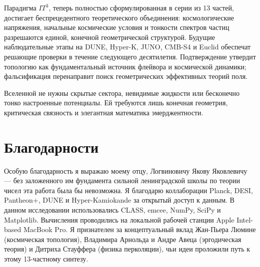 \documentclass[12pt,a4paper]{article}
\begin{document}
Парадигма $IT^3$, теперь полностью сформулированная в серии из 13 частей, достигает беспрецедентного теоретического объединения: космологические напряжения, начальные космические условия и тонкости спектров частиц разрешаются единой, конечной геометрической структурой. Будущие наблюдательные этапы на DUNE, Hyper-K, JUNO, CMB-S4 и Euclid обеспечат решающие проверки в течение следующего десятилетия. Подтверждение утвердит топологию как фундаментальный источник флейвора и космической динамики; фальсификация перенаправит поиск геометрических эффективных теорий поля. 

Вселенной не нужны скрытые сектора, невидимые жидкости или бесконечно тонко настроенные потенциалы. Ей требуются лишь конечная геометрия, критическая связность и элегантная математика эмерджентности.

\section*{Благодарности}
Особую благодарность я выражаю моему отцу, Логвиновичу Якову Яковлевичу — без заложенного им фундамента сильной ленинградской школы по теории чисел эта работа была бы невозможна. Я благодарю коллаборации Planck, DESI, Pantheon+, DUNE и Hyper-Kamiokande за открытый доступ к данным. В данном исследовании использовались CLASS, emcee, NumPy, SciPy и Matplotlib. Вычисления проводились на локальной рабочей станции Apple Intel-based MacBook Pro. Я признателен за концептуальный вклад Жан-Пьера Люмине (космическая топология), Владимира Арнольда и Андре Авеца (эргодическая теория) и Дитриха Стауффера (физика перколяции), чьи идеи проложили путь к этому 13-частному синтезу.
\end{document}
